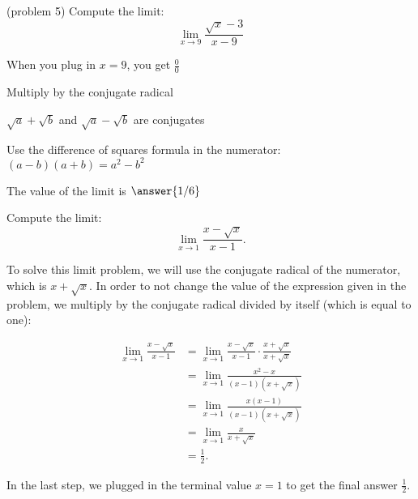 \documentclass[handout]{ximera}
\begin{document}
\begin{problem}(problem 5)
  Compute the limit:
  \[
  \lim_{x \to 9} \frac{\sqrt{x}-3}{x-9}
  \]
  
    \begin{hint}
      When you plug in $x = 9$, you get $\frac00$
    \end{hint}
    \begin{hint}
      Multiply by the conjugate radical
    \end{hint}
    \begin{hint}
      $\sqrt a + \sqrt b$ and $\sqrt a - \sqrt b$ are conjugates
    \end{hint}
    \begin{hint}
      Use the difference of squares formula in the numerator: $(a-b)(a+b) = a^2 - b^2$ 
    \end{hint}
    
		The value of the limit is
		 $\answer{1/6}$
		
\end{problem}



\begin{example}[example 6]
Compute the limit:
\[\lim_{x \to 1} \frac{x- \sqrt{x}}{x-1}.\]

To solve this limit problem, we will use the conjugate radical of the
numerator, which is $x+ \sqrt{x}$.  In order to not change the value of
the expression given in the problem, we multiply by the conjugate radical
divided by itself (which is equal to one):



\begin{align*}
\lim_{x \to 1} \frac{x- \sqrt{x}}{x-1} &=
\lim_{x \to 1} \frac{x- \sqrt{x}}{x-1}\cdot \frac{x+ \sqrt{x}}{x+ \sqrt{x}} \\[.4 em]
 &= \lim_{x \to 1} \frac{x^2- x}{(x-1)(x+ \sqrt{x})} \\[.4 em]
&= \lim_{x \to 1} \frac{x(x-1)}{(x-1)(x+ \sqrt{x})} \\[.4 em]
&= \lim_{x \to 1}\frac{x}{x+ \sqrt{x}} \\[.4 em]
&= \frac 12.
\end{align*}

In the last step, we plugged in the terminal value $x=1$ to get the final answer $\frac12$.

\end{example}
\end{document}
